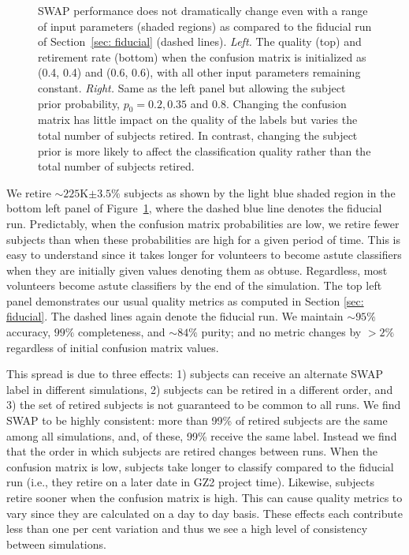 \documentclass[twocolumn,  trackchanges, ]{aastex6}%
\newcommand{\p}{$p_0$}
\begin{document}
\begin{figure}[t]
\caption{SWAP performance does not dramatically change even with a range of input parameters (shaded regions) as compared to the fiducial run of Section~\ref{sec: fiducial} (dashed lines).  \textit{Left.} The quality (top) and retirement rate (bottom) when the confusion matrix is initialized as (0.4, 0.4) and (0.6, 0.6), with all other input parameters remaining constant. \textit{Right.} Same as the left panel but allowing the subject prior probability, \p $= 0.2, 0.35$ and $0.8$. Changing the confusion matrix has little impact on the quality of the labels but varies the total number of subjects retired. In contrast, changing the subject prior is more likely to affect the classification quality rather than the total number of subjects retired. \label{fig: tweak swap}}
\end{figure}

We retire $\sim$$225$K$\pm3.5\%$ subjects as shown by the light blue shaded region in the bottom left panel of Figure~\ref{fig: tweak swap}, where the dashed blue line denotes the fiducial run. Predictably, when the confusion matrix probabilities are low, we retire fewer subjects than when these probabilities are high for a given period of time. This is easy to understand since it takes longer for volunteers to become astute classifiers when they are initially given values denoting them as obtuse. Regardless, most volunteers become astute classifiers by the end of the simulation. The top left panel demonstrates our usual quality metrics as computed in Section \ref{sec: fiducial}. The dashed lines again denote the fiducial run. We maintain $\sim$$95\%$ accuracy, $99\%$ completeness, and $\sim$$84\%$ purity;  and no metric changes by $> 2\%$ regardless of initial confusion matrix values.  
 
This spread is due to three effects: 
1) subjects can receive an alternate SWAP label in different simulations, 
2) subjects can be retired in a different order, and 
3) the set of retired subjects is not guaranteed to be common to all runs. 
We find SWAP to be highly consistent: more than 99\% of retired subjects are the same among all simulations, and, of these, 99\% receive the same label.  Instead we find that the order in which subjects are retired changes between runs. When the confusion matrix is low, subjects take longer to classify compared to the fiducial run (i.e., they retire on a later date in GZ2 project time). Likewise, subjects retire sooner when the confusion matrix is high. This can cause quality metrics to vary since they are calculated on a day to day basis. These effects each contribute less than one per cent variation and thus we see a high level of consistency between simulations. 
\end{document}
